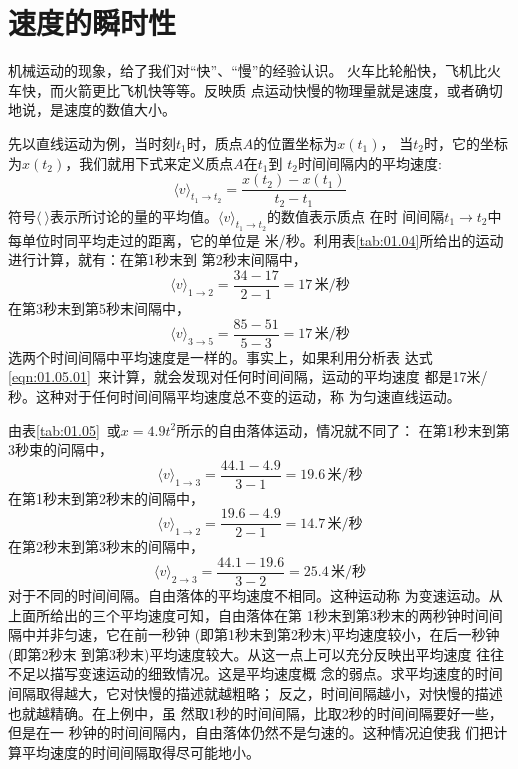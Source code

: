 \section{速度的瞬时性}\label{sec:01.06}

机械运动的现象，给了我们对“快”、“慢”的经验认识。
火车比轮船快，飞机比火车快，而火箭更比飞机快等等。反映质
点运动快慢的物理量就是速度，或者确切地说，是速度的数值大小。

先以直线运动为例，当时刻$ t_1 $时，质点$ A $的位置坐标为$ x\left(t_1\right) $，
当$ t_2 $时，它的坐标为$ x\left(t_2\right) $，我们就用下式来定义质点$ A $在$ t_1 $到
$ t_2 $时间间隔内的平均速度:
\begin{equation}
    \langle v\rangle_{t_{1} \rightarrow t_{2}}=\frac{x\left(t_{2}\right)-x\left(t_{1}\right)}{t_{2}-t_{1}} \label{eqn:01.06.01}
\end{equation}
符号$\langle ~ \rangle$表示所讨论的量的平均值。$\langle v\rangle_{t_{1} \rightarrow t_{2}}$的数值表示质点
在时
\clearpage
\noindent 间间隔$t_{1} \rightarrow t_{2}$中每单位时同平均走过的距离，它的单位是
米/秒。利用表\ref{tab:01.04}所给出的运动进行计算，就有：在第1秒末到
第2秒末间隔中，
\begin{equation*}
    \langle v\rangle_{1 \rightarrow 2}=\frac{34-17}{2-1}=17\,\text{米/秒}
\end{equation*}
在第3秒末到第5秒末间隔中，
\begin{equation*}
    \langle v\rangle_{3 \rightarrow 5}=\frac{85-51}{5-3}=17\,\text{米/秒}
\end{equation*}
选两个时间间隔中平均速度是一样的。事实上，如果利用分析表
达式\eqref{eqn:01.05.01}~来计算，就会发现对任何时间间隔，运动的平均速度
都是17米/秒。这种对于任何时间间隔平均速度总不变的运动，称
为匀速直线运动。

由表\ref{tab:01.05}~或$x=4.9t^2$所示的自由落体运动，情况就不同了：
在第1秒末到第3秒束的问隔中，
\begin{equation*}
    \langle v\rangle_{1 \rightarrow 3}=\frac{44.1-4.9}{3-1}=19.6\,\text{米/秒}
\end{equation*}
在第1秒末到第2秒末的间隔中，
\begin{equation*}
    \langle v\rangle_{1 \rightarrow 2}=\frac{19.6-4.9}{2-1}=14.7\,\text{米/秒}
\end{equation*}
在第2秒末到第3秒末的间隔中，
\begin{equation*}
    \langle v\rangle_{2 \rightarrow 3}=\frac{44.1-19.6}{3-2}=25.4\,\text{米/秒}
\end{equation*}
对于不同的时间间隔。自由落体的平均速度不相同。这种运动称
为变速运动。从上面所给出的三个平均速度可知，自由落体在第
1秒末到第3秒末的两秒钟时间间隔中并非匀速，它在前一秒钟
(即第1秒末到第2秒末)平均速度较小，在后一秒钟(即第2秒末
到第3秒末)平均速度较大。从这一点上可以充分反映出平均速度
往往不足以描写变速运动的细致情况。这是平均速度概
念的弱点。求平均速度的时间间隔取得越大，它对快慢的描述就越粗略；
反之，时间间隔越小，对快慢的描述也就越精确。在上例中，虽
然取1秒的时间间隔，比取2秒的时间间隔要好一些，但是在一
秒钟的时间间隔内，自由落体仍然不是匀速的。这种情况迫使我
们把计算平均速度的时间间隔取得尽可能地小。

